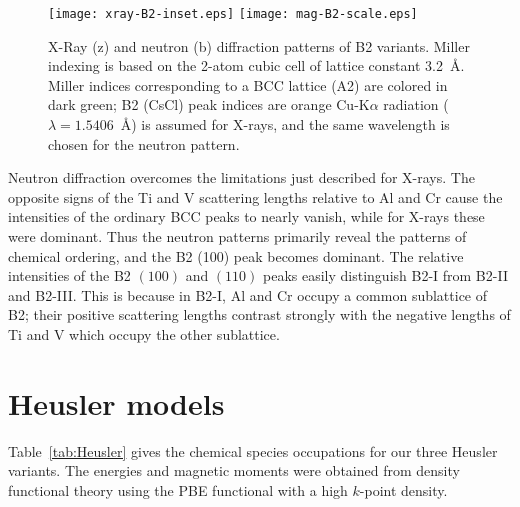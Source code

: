 \documentclass[twoside,12pt]{article}
\begin{document}
\begin{figure}[h!]
\texttt{[image: xray-B2-inset.eps]}
\texttt{[image: mag-B2-scale.eps]}
  \caption{\label{fig:B2} X-Ray (z) and neutron (b) diffraction patterns of  B2 variants. Miller indexing is based on the 2-atom cubic cell of lattice constant 3.2~\AA. Miller indices corresponding to a BCC lattice (A2) are colored in dark green; B2 (CsCl) peak indices are orange Cu-K$\alpha$ radiation ($\lambda=1.5406$~\AA) is assumed for X-rays, and the same wavelength is chosen for the neutron pattern.}
\end{figure}

Neutron diffraction overcomes the limitations just described for X-rays. The opposite signs of the Ti and V scattering lengths relative to Al and Cr cause the intensities of the ordinary BCC peaks to nearly vanish, while for X-rays these were dominant. Thus the neutron patterns primarily reveal the patterns of chemical ordering, and the B2 (100) peak becomes dominant. The relative intensities of the B2 $(100)$ and $(110)$ peaks easily distinguish B2-I from B2-II and B2-III. This is because in B2-I, Al and Cr occupy a common sublattice of B2; their positive scattering lengths contrast strongly with the negative lengths of Ti and V which occupy the other sublattice.


\section{Heusler models}
\label{sec:neutron}

Table~\ref{tab:Heusler} gives the chemical species occupations for our three Heusler variants. The energies and magnetic moments were obtained from density functional theory using the PBE functional with a high $k$-point density.
\end{document}
